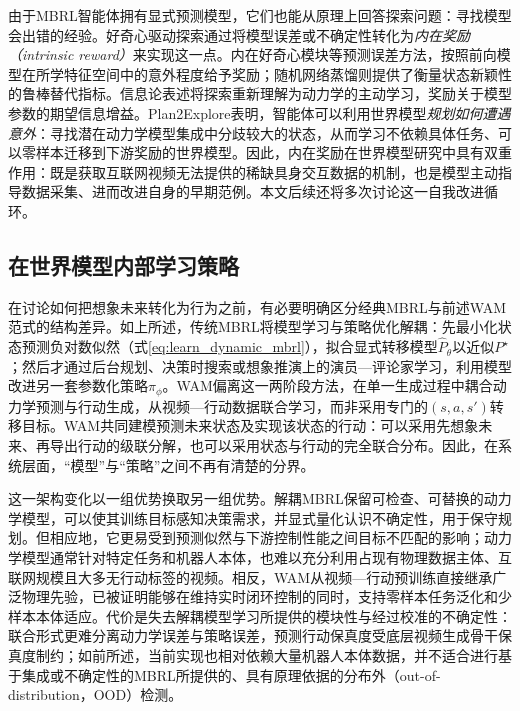 由于MBRL智能体拥有显式预测模型，它们也能从原理上回答探索问题：寻找模型会出错的经验。好奇心驱动探索通过将模型误差或不确定性转化为\emph{内在奖励（intrinsic reward）}来实现这一点。内在好奇心模块等预测误差方法，按照前向模型在所学特征空间中的意外程度给予奖励\citep{pathak2017curiosity}；随机网络蒸馏则提供了衡量状态新颖性的鲁棒替代指标\citep{burda2019rnd}。信息论表述将探索重新理解为动力学的主动学习，奖励关于模型参数的期望信息增益\citep{houthooft2016vime}。Plan2Explore表明，智能体可以利用世界模型\emph{规划如何遭遇意外}：寻找潜在动力学模型集成中分歧较大的状态，从而学习不依赖具体任务、可以零样本迁移到下游奖励的世界模型\citep{sekar2020plan2explore}。因此，内在奖励在世界模型研究中具有双重作用：既是获取互联网视频无法提供的稀缺具身交互数据的机制，也是模型主动指导数据采集、进而改进自身的早期范例。本文后续还将多次讨论这一自我改进循环。

\subsection{在世界模型内部学习策略}
在讨论如何把想象未来转化为行为之前，有必要明确区分经典MBRL与前述WAM范式的结构差异。如上所述，传统MBRL将模型学习与策略优化解耦：先最小化状态预测负对数似然（式\eqref{eq:learn_dynamic_mbrl}），拟合显式转移模型$\hat{P}_\theta$以近似$P^\star$；然后才通过后台规划、决策时搜索或想象推演上的演员—评论家学习，利用模型改进另一套参数化策略$\pi_\phi$。WAM偏离这一两阶段方法，在单一生成过程中耦合动力学预测与行动生成，从视频—行动数据联合学习，而非采用专门的$(s,a,s')$转移目标\citep{ye2026dreamzero,wang2026wam_survey}。WAM共同建模预测未来状态及实现该状态的行动：可以采用先想象未来、再导出行动的级联分解，也可以采用状态与行动的完全联合分布\citep{ye2026dreamzero}。因此，在系统层面，“模型”与“策略”之间不再有清楚的分界。

这一架构变化以一组优势换取另一组优势。解耦MBRL保留可检查、可替换的动力学模型，可以使其训练目标感知决策需求\citep{grimm2020valueequivalence,farahmand2017vaml}，并显式量化认识不确定性，用于保守规划\citep{chua2018pets,janner2019mbpo}。但相应地，它更易受到预测似然与下游控制性能之间目标不匹配的影响\citep{lambert2020objectivemismatch}；动力学模型通常针对特定任务和机器人本体，也难以充分利用占现有物理数据主体、互联网规模且大多无行动标签的视频。相反，WAM从视频—行动预训练直接继承广泛物理先验，已被证明能够在维持实时闭环控制的同时，支持零样本任务泛化和少样本本体适应\citep{Ye2026b}。代价是失去解耦模型学习所提供的模块性与经过校准的不确定性：联合形式更难分离动力学误差与策略误差，预测行动保真度受底层视频生成骨干保真度制约；如前所述，当前实现也相对依赖大量机器人本体数据，并不适合进行基于集成或不确定性的MBRL所提供的、具有原理依据的分布外（out-of-distribution，OOD）检测。

